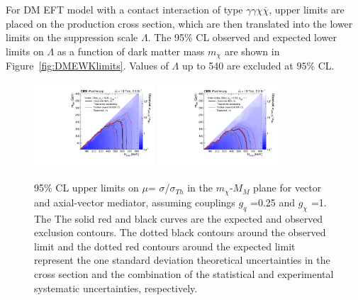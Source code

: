 
For DM EFT model with a contact interaction of type $\gamma\gamma\chi\overline{\chi}$, upper limits are placed on the production cross section, which are then translated into the lower limits on the suppression scale $\Lambda$. The 95\% CL observed and expected lower limits on $\Lambda$ as a function of dark matter mass $m_{\chi}$ are shown in Figure~\ref{fig:DMEWKlimits}. Values of $\Lambda$ up to 540 \GeV are excluded at $95\%$ CL.

\begin{figure}[htb]
\caption[Exclusion plots in $m_{\chi}-m_M$ plane]{95\% CL upper limits on $\mu$= $\sigma$/$\sigma_{Th}$ in the $m_{\chi}$-$M_{M}$ plane for vector and axial-vector mediator, assuming couplings $g_{q}$ =0.25 and $g_{\chi}$ =1.
The The solid red and black curves are the expected and observed exclusion contours. 
The dotted black contours around the observed limit and the
 dotted red contours around the expected limit represent the
 one standard deviation theoretical uncertainties in the cross
 section and the combination of the statistical and experimental
 systematic uncertainties, respectively.}
\label{fig:2d}
\begin{center}
\includegraphics[width=0.4\textwidth]{pdfs/lgxc/fromb/V.pdf}
\includegraphics[width=0.4\textwidth]{pdfs/lgxc/fromb/AV.pdf}
\end{center}
\end{figure}


